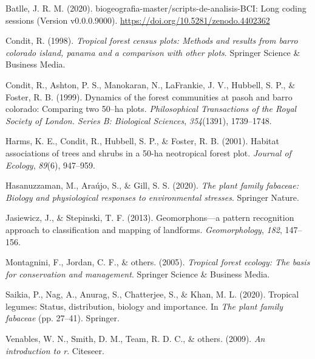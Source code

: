 \documentclass[11pt,]{article}
\begin{document}
\hypertarget{ref-jose_ramon_martinez_batlle_2020_4402362}{}
Batlle, J. R. M. (2020). biogeografia-master/scripts-de-analisis-BCI:
Long coding sessions (Version v0.0.0.9000).
\url{https://doi.org/10.5281/zenodo.4402362}

\hypertarget{ref-condit1998tropical}{}
Condit, R. (1998). \emph{Tropical forest census plots: Methods and
results from barro colorado island, panama and a comparison with other
plots}. Springer Science \& Business Media.

\hypertarget{ref-condit1999dynamics}{}
Condit, R., Ashton, P. S., Manokaran, N., LaFrankie, J. V., Hubbell, S.
P., \& Foster, R. B. (1999). Dynamics of the forest communities at pasoh
and barro colorado: Comparing two 50--ha plots. \emph{Philosophical
Transactions of the Royal Society of London. Series B: Biological
Sciences}, \emph{354}(1391), 1739--1748.

\hypertarget{ref-harms2001habitat}{}
Harms, K. E., Condit, R., Hubbell, S. P., \& Foster, R. B. (2001).
Habitat associations of trees and shrubs in a 50-ha neotropical forest
plot. \emph{Journal of Ecology}, \emph{89}(6), 947--959.

\hypertarget{ref-hasanuzzaman2020plant}{}
Hasanuzzaman, M., Araújo, S., \& Gill, S. S. (2020). \emph{The plant
family fabaceae: Biology and physiological responses to environmental
stresses}. Springer Nature.

\hypertarget{ref-jasiewicz2013geomorphons}{}
Jasiewicz, J., \& Stepinski, T. F. (2013). Geomorphons---a pattern
recognition approach to classification and mapping of landforms.
\emph{Geomorphology}, \emph{182}, 147--156.

\hypertarget{ref-montagnini2005tropical}{}
Montagnini, F., Jordan, C. F., \& others. (2005). \emph{Tropical forest
ecology: The basis for conservation and management}. Springer Science \&
Business Media.

\hypertarget{ref-saikia2020tropical}{}
Saikia, P., Nag, A., Anurag, S., Chatterjee, S., \& Khan, M. L. (2020).
Tropical legumes: Status, distribution, biology and importance. In
\emph{The plant family fabaceae} (pp. 27--41). Springer.

\hypertarget{ref-venables2009introduction}{}
Venables, W. N., Smith, D. M., Team, R. D. C., \& others. (2009).
\emph{An introduction to r}. Citeseer.




\newpage
\singlespacing 
\end{document}
